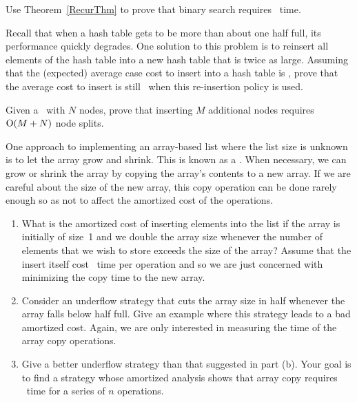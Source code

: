 \begin{exercises}
\item
Use Theorem~\ref{RecurThm} to prove that binary
search requires \Thetalogn\ time.

\item
Recall that when a hash table gets to be more than
about one half full, its performance quickly degrades.
One solution to this problem is to reinsert all elements of the hash
table into a new hash table that is twice as large.
Assuming that the (expected) average case cost to insert into a hash
table is \Thetaone, prove that the average cost to insert is still
\Thetaone\ when this re-insertion policy is used.

\item
Given a \TTtree\ with $N$ nodes, prove that inserting $M$ additional
nodes requires ${\rm O}(M+N)$ node splits.

\item
One approach to implementing an array-based list where the list size
is unknown is to let the array grow and shrink.
This is known as a .
When necessary, we can grow or shrink the array by copying the array's 
contents to a new array.
If we are careful about the size of the new array, this copy operation 
can be done rarely enough so as not to affect the amortized cost of
the operations.

\begin{enumerate}
\item
What is the amortized cost of inserting
elements into the list if
the array is initially of size~1 and we double the array size whenever
the number of elements that we wish to store exceeds the size of the
array?
Assume that the insert itself cost \Oone\ time per operation and so we 
are just concerned with minimizing the copy time to the new array.

\item
Consider an underflow strategy that cuts the array size in half
whenever the array falls below half full.
Give an example where this strategy leads to a bad amortized cost.
Again, we are only interested in measuring the time of the array copy
operations.

\item
Give a better underflow strategy than that suggested in part (b).
Your goal is to find a strategy whose
amortized analysis shows that array copy requires \On\ time for a
series of \(n\) operations.
\end{enumerate}


\end{exercises}
